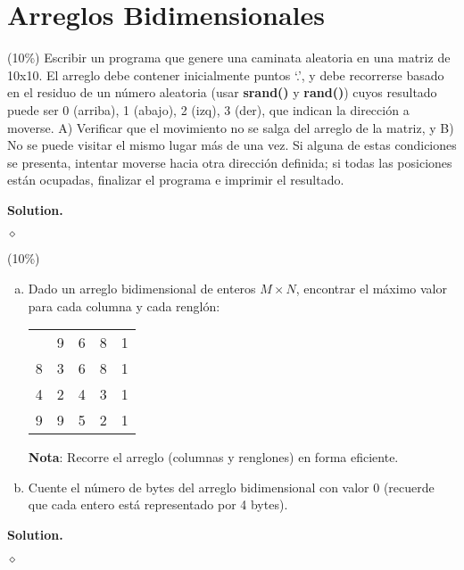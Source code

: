 \documentclass{article}
\theoremstyle{problemstyle}
\newenvironment{solution}{%
  \begin{mdframed}[linewidth=0.8pt,linecolor=Gray,backgroundcolor=Gray!5,roundcorner=5pt, nobreak=true]%
  \noindent\textbf{Solution.}%
}{%
\hfill $ \diamond $ 
  \end{mdframed}%
}
\begin{document}
\section*{Arreglos Bidimensionales}\label{sec:arreglos_bidimensionales} %
\begin{problem}
  (10\%) Escribir un programa que genere una caminata aleatoria en una matriz de 10x10. El arreglo debe contener inicialmente puntos `.', y debe recorrerse basado en el residuo de un n\'umero aleatoria (usar \textbf{srand()} y \textbf{rand()}) cuyos resultado puede ser {0 (arriba), 1 (abajo), 2 (izq), 3 (der)}, que indican la direcci\'on a moverse. A) Verificar que el movimiento no se salga del arreglo de la matriz, y B) No se puede visitar el mismo lugar más de una vez. Si alguna de estas condiciones se presenta, intentar moverse hacia otra direcci\'on definida; si todas las posiciones están ocupadas, finalizar el programa e imprimir el resultado.
\end{problem}

\begin{solution}

\end{solution}

\begin{problem}
(10\%)
\begin{enumerate}[a)]
	\item Dado un arreglo bidimensional de enteros $ M\times N $, encontrar el m\'aximo valor para cada columna y cada rengl\'on:
	      \setlength\doublerulesep{0.5pt}
	      \begin{center}
		      \begin{tabular}[c]{|c||c|c|c|c|}
			      \hline
			        & 9 & 6 & 8 & 1 \\
			      \hhline{|=#=|=|=|=|}
			      8 & 3 & 6 & 8 & 1 \\
			      \hline
			      4 & 2 & 4 & 3 & 1 \\
			      \hline
			      9 & 9 & 5 & 2 & 1 \\
			      \hline
		      \end{tabular}
	      \end{center}
	      \textbf{Nota}: Recorre el arreglo (columnas y renglones) en forma eficiente.

	\item Cuente el n\'umero de bytes del arreglo bidimensional con valor 0 (recuerde que cada entero est\'a representado por 4 bytes).
\end{enumerate}

\end{problem}
\begin{solution}

\end{solution}
\end{document}
